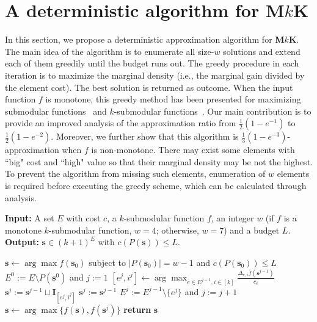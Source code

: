 \documentclass[preprint,12pt]{elsarticle}
\def\bs{\boldsymbol{s}}
\def\bI{\boldsymbol{I}}
\def\tM{\textbf{M$k$K}}
\begin{document}
\section{A deterministic algorithm for \tM}\label{alg-ana}
In this section, we propose a deterministic approximation algorithm for \tM. The main idea of the algorithm is to enumerate all size-$w$ solutions and extend each of them greedily until the budget runs out. The greedy procedure in each iteration is to maximize the marginal density (i.e., the marginal gain divided by the element cost). The best solution is returned as outcome.
When the input function $f$ is monotone, this greedy method has been presented for maximizing submodular functions~\cite{M} and $k$-submodular functions~\cite{TWC}. Our main contribution is to provide an improved analysis of the approximation ratio from $\frac{1}{2}(1-e^{-1})$ to $\frac{1}{2}(1-e^{-2})$.
Moreover, we further show that this algorithm is $\frac13(1-e^{-3})$-approximation when $f$ is non-monotone.
There may exist some elements with ``big" cost and ``high" value so that their marginal density may be not the highest.
To prevent the algorithm from missing such elements, enumeration of $w$ elements is required before executing the greedy scheme, which can be calculated through analysis.
\begin{algorithm}[htb]
    \caption{Greedy algorithm for \tM }\label{greedy}
    \textbf{Input:} A set $E$ with cost $c$, a $k$-submodular function $f$, an integer $w$ (if $f$ is a monotone $k$-submodular function, $w = 4$; otherwise, $w=7$) and a budget $L$. \\
    \textbf{Output:} $\bs\in (k+1)^E$ with $c(P(\bs))\le L$.

    \begin{algorithmic}[1]
        \STATE $\bs\gets\arg\max f(\bs_0)$ subject to $|P(\bs_0)|=w-1$ and $c(P(\bs_0))\le L$
        \FOR{every $\bs^0 \ (|P(\bs^0)|=w$ and $c(P(\bs^0))\le L)$}
            \STATE $E^0:=E\setminus P(\bs^0)$ and $j:=1$
                \STATE $[e^j, i^j]\gets \arg\max_{e\in E^{j-1}, i\in[k]}\frac{\Delta_{e, i}f(\bs^{j-1})}{c_e}$
                \IF{$c(P(\bs^{j-1}))+c_{e^j}\le L$}
                    \STATE $\bs^j:=\bs^{j-1}\sqcup\bI_{[e^j, i^j]}$
                \ELSE
                    \STATE $\bs^j:=\bs^{j-1}$
                \ENDIF
                \STATE $E^j:=E^{j-1}\setminus\{e^j\}$ and $j:=j+1$
            \ENDWHILE
            \STATE $\bs\gets \arg\max\{f(\bs), f(\bs^j)\}$
        \ENDFOR
        \STATE \textbf{return } $\bs$
    \end{algorithmic}
\end{algorithm}
\end{document}
